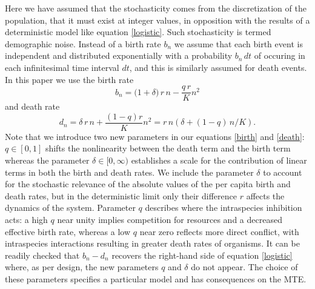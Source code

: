 Here we have assumed that the stochasticity comes from the discretization of the population, that it must exist at integer values, in opposition with the results of a deterministic model like equation \ref{logistic}.
Such stochasticity is termed demographic noise.
Instead of a birth rate $b_n$ we assume that each birth event is independent and distributed exponentially with a probability $b_n\,dt$ of occuring in each infinitesimal time interval $dt$, and this is similarly assumed for death events. %
In this paper we use the birth rate
\begin{equation}
 b_n = \Big(1 + \delta\Big)\,r\,n - \frac{q\,r}{K}n^2%
\label{birth}
\end{equation}
and death rate
\begin{equation}
 d_n = \delta\,r\,n + \frac{(1-q)r}{K} n^2 = r\,n\left(\delta+(1-q)\,n/K\right).
\label{death}
\end{equation}
Note that we introduce two new parameters in our equations \ref{birth} and \ref{death}: $q\in[0,1]$ shifts the nonlinearity between the death term and the birth term whereas the parameter $\delta\in[0,\infty)$ establishes a scale for the contribution of linear terms in both the birth and death rates.
We include the parameter $\delta$ to account for the stochastic relevance of the absolute values of the per capita birth and death rates, but in the deterministic limit only their difference $r$ affects the dynamics of the system.
Parameter $q$ describes where the intraspecies inhibition acts: a high $q$ near unity implies competition for resources and a decreased effective birth rate, whereas a low $q$ near zero reflects more direct conflict, with intraspecies interactions resulting in greater death rates of organisms.
It can be readily checked that $b_n-d_n$ recovers the right-hand side of equation \ref{logistic} where, as per design, the new parameters $q$ and $\delta$ do not appear.
The choice of these parameters specifies a particular model and has consequences on the MTE.

